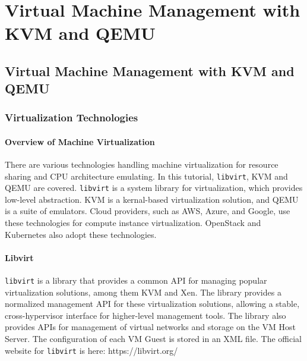 \FILENAME\

\chapter{Virtual Machine Management with KVM and QEMU}

\hypertarget{virtual-machine-management-with-kvm-and-qemu}{%
\section{Virtual Machine Management with KVM and
QEMU}\label{virtual-machine-management-with-kvm-and-qemu}}

\hypertarget{virtualization-technologies}{%
\subsection{Virtualization
Technologies}\label{virtualization-technologies}}

\hypertarget{overview-of-machine-virtualization}{%
\subsubsection{Overview of Machine
Virtualization}\label{overview-of-machine-virtualization}}

There are various technologies handling machine virtualization for
resource sharing and CPU architecture emulating. In this tutorial,
\texttt{libvirt}, KVM and QEMU are covered. \texttt{libvirt} is a system
library for virtualization, which provides low-level abstraction. KVM is
a kernal-based virtualization solution, and QEMU is a suite of
emulators. Cloud providers, such as AWS, Azure, and Google, use these
technologies for compute instance virtualization. OpenStack and
Kubernetes also adopt these technologies.

\hypertarget{libvirt}{%
\subsubsection{Libvirt}\label{libvirt}}

\texttt{libvirt} is a library that provides a common API for managing
popular virtualization solutions, among them KVM and Xen. The library
provides a normalized management API for these virtualization solutions,
allowing a stable, cross-hypervisor interface for higher-level
management tools. The library also provides APIs for management of
virtual networks and storage on the VM Host Server. The configuration of
each VM Guest is stored in an XML file. The official website for
\texttt{libvirt} is here: https://libvirt.org/

